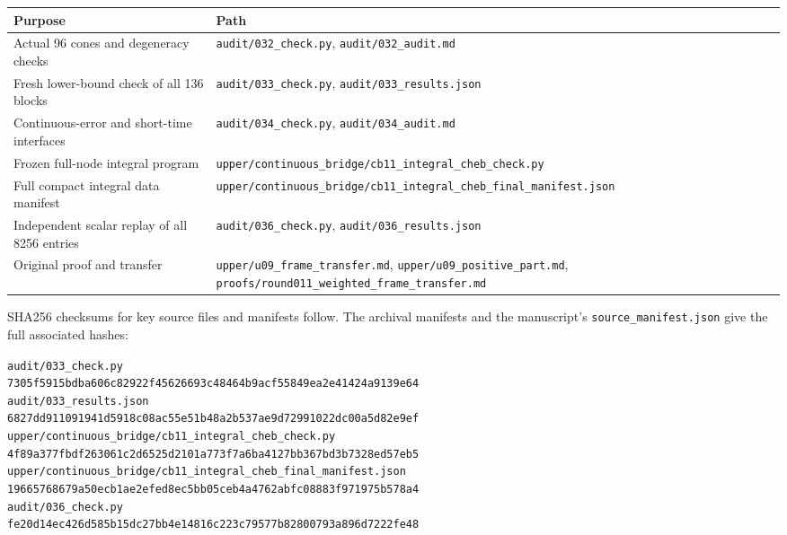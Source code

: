 \documentclass[11pt,a4paper]{article}
\theoremstyle{definition}\newtheorem{definition}[theorem]{Definition}
\theoremstyle{remark}\newtheorem{remark}[theorem]{Remark}
\newcommand{\src}[1]{\nolinkurl{#1}}
\begin{document}
\begin{center}\small
\begin{tabular}{p{}p{}}\toprule
Purpose&Path\\\midrule
Actual 96 cones and degeneracy checks&\src{audit/032_check.py}, \src{audit/032_audit.md}\\
Fresh lower-bound check of all 136 blocks&\src{audit/033_check.py}, \src{audit/033_results.json}\\
Continuous-error and short-time interfaces&\src{audit/034_check.py}, \src{audit/034_audit.md}\\
Frozen full-node integral program&\src{upper/continuous_bridge/cb11_integral_cheb_check.py}\\
Full compact integral data manifest&\src{upper/continuous_bridge/cb11_integral_cheb_final_manifest.json}\\
Independent scalar replay of all 8256 entries&\src{audit/036_check.py}, \src{audit/036_results.json}\\
Original proof and transfer&\src{upper/u09_frame_transfer.md}, \src{upper/u09_positive_part.md}, \src{proofs/round011_weighted_frame_transfer.md}\\\bottomrule
\end{tabular}
\end{center}
SHA256 checksums for key source files and manifests follow. The archival manifests and the manuscript's \src{source_manifest.json} give the full associated hashes:
\begin{flushleft}\footnotesize
\src{audit/033_check.py}\\
\src{7305f5915bdba606c82922f45626693c48464b9acf55849ea2e41424a9139e64}\\[1mm]
\src{audit/033_results.json}\\
\src{6827dd911091941d5918c08ac55e51b48a2b537ae9d72991022dc00a5d82e9ef}\\[1mm]
\src{upper/continuous_bridge/cb11_integral_cheb_check.py}\\
\src{4f89a377fbdf263061c2d6525d2101a773f7a6ba4127bb367bd3b7328ed57eb5}\\[1mm]
\src{upper/continuous_bridge/cb11_integral_cheb_final_manifest.json}\\
\src{19665768679a50ecb1ae2efed8ec5bb05ceb4a4762abfc08883f971975b578a4}\\[1mm]
\src{audit/036_check.py}\\
\src{fe20d14ec426d585b15dc27bb4e14816c223c79577b82800793a896d7222fe48}
\end{flushleft}
\end{document}

